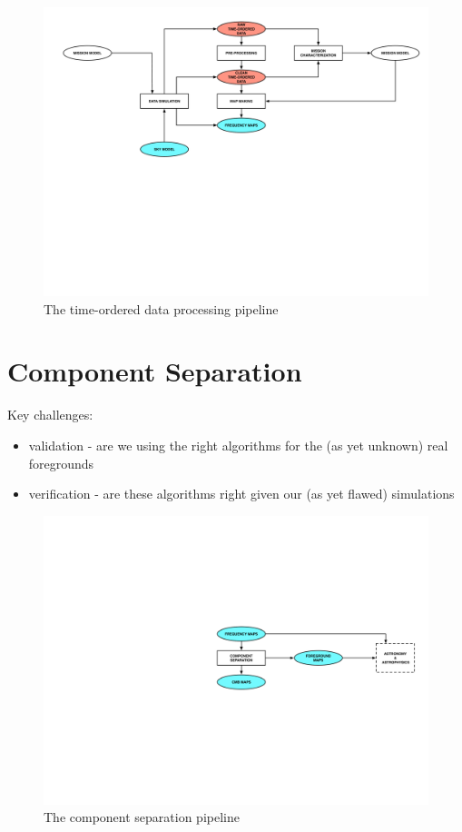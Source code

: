 \begin{figure}[htbp]
\centering
\includegraphics[width=1\textwidth]{Analysis/tod}
\caption{The time-ordered data processing pipeline}
\label{default}

\end{figure}

\newpage

\section{Component Separation}

Key challenges:
\begin{itemize}
\item validation - are we using the right algorithms for the (as yet unknown) real foregrounds
\item verification - are these algorithms right given our (as yet flawed) simulations
\end{itemize}

\begin{figure}[htbp]
\centering
\includegraphics[width=1\textwidth]{Analysis/cs}
\caption{The component separation pipeline}
\label{default}

\end{figure}

